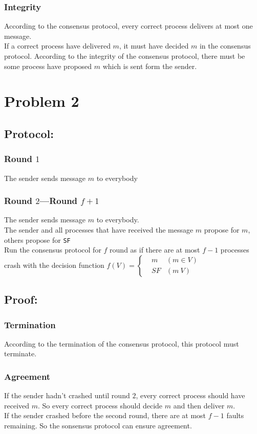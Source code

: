 \documentclass[12pt]{article}
\begin{document}
\subsubsection*{Integrity}
According to the consensus protocol, every correct process delivers at most one message.\\
If a correct process have delivered $m$, it must have decided $m$ in the consensus protocol. According to the integrity of the consensus protocol, there must be some process have proposed $m$ which is sent form the sender.

\section*{Problem 2}
\subsection*{Protocol:}
\subsubsection*{Round $1$}
The sender sends message $m$ to everybody
\subsubsection*{Round $2$---Round $f+1$}
The sender sends message $m$ to everybody.\\
The sender and all processes that have received the message $m$ propose for $m$, others propose for \texttt{SF}\\
Run the consensus protocol for $f$ round as if there are at most $f-1$ processes crash with the decision function
$
	f(V)=\left\{
	\begin{aligned}
		&m  &(m\in V)\\
		&SF &(m\ V)
	\end{aligned}
	\right.
$
\subsection*{Proof:}
\subsubsection*{Termination}
According to the termination of the consensus protocol, this protocol must terminate.
\subsubsection*{Agreement}
If the sender hadn't crashed until round $2$, every correct process should have received $m$. So every correct process should decide $m$ and then deliver $m$.\\
If the sender crashed before the second round, there are at most $f-1$ faults remaining. So the sonsensus protocol can ensure agreement.
\end{document}
